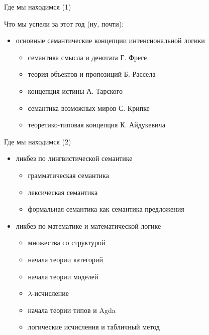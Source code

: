 \documentclass{beamer}
\begin{document}
\begin{frame}{Где мы находимся (1)}
\begin{small}
Что мы успели за этот год (ну, почти):\\
\medskip
\begin{itemize}
    \item основные семантические концепции интенсиональной логики
    \begin{itemize}
        \item семантика смысла и денотата Г. Фреге
        \item теория объектов и пропозиций Б. Рассела
        \item концепция истины А. Тарского
        \item семантика возможных миров С. Крипке
        \item теоретико-типовая концепция К. Айдукевича    
    \end{itemize}
\end{itemize}
\end{small}
\end{frame}

\begin{frame}{Где мы находимся (2)}
\begin{small}
\begin{itemize}
    \item ликбез по лингвистической семантике
    \begin{itemize}
        \item грамматическая семантика
        \item лексическая семантика
        \item формальная семантика как семантика предложения
    \end{itemize}
    \item ликбез по математике и математической логике
    \begin{itemize}
        \item множества со структурой
        \item начала теории категорий
        \item начала теории моделей
        \item $\lambda$-исчисление
        \item начала теории типов и Agda
        \item логические исчисления и табличный метод
    \end{itemize}
\end{itemize}
\end{small}
\end{frame}
\end{document}
